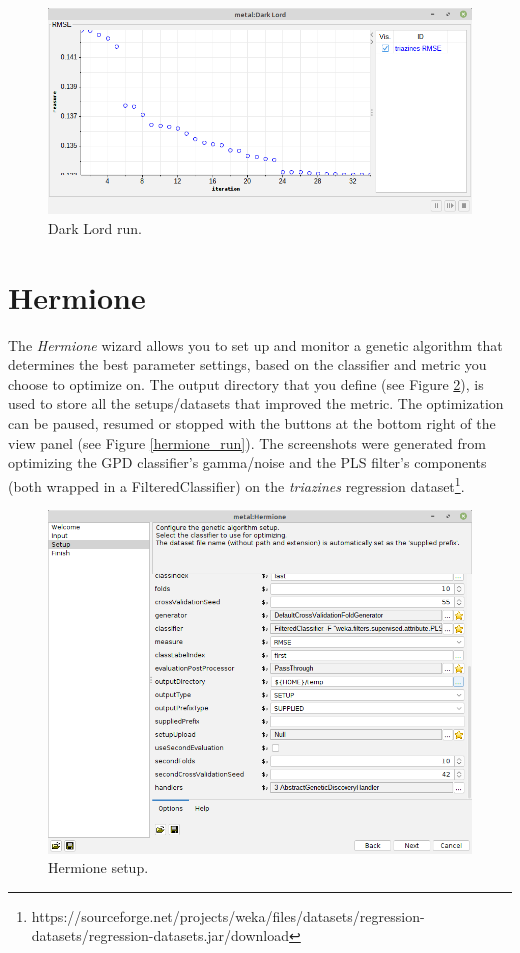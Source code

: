 \begin{figure}[htb]
  \centering
  \includegraphics[width=12.0cm]{images/darklord_run.png}
  \caption{Dark Lord run.}
  \label{darklord_run}
\end{figure}

\clearpage
\section{Hermione}
The \textit{Hermione} wizard allows you to set up and monitor a genetic
algorithm that determines the best parameter settings, based on the classifier
and metric you choose to optimize on. The output directory that you define
(see Figure \ref{hermione_setup}), is used to store all the setups/datasets
that improved the metric. The optimization can be paused, resumed or
stopped with the buttons at the bottom right of the view panel (see Figure
\ref{hermione_run}). The screenshots were generated from optimizing
the GPD classifier's gamma/noise and the PLS filter's components (both wrapped
in a FilteredClassifier) on the \textit{triazines} regression
dataset\footnote{\url{}{https://sourceforge.net/projects/weka/files/datasets/regression-datasets/regression-datasets.jar/download}}.

\begin{figure}[htb]
  \centering
  \includegraphics[width=12.0cm]{images/hermione_setup.png}
  \caption{Hermione setup.}
  \label{hermione_setup}
\end{figure}

